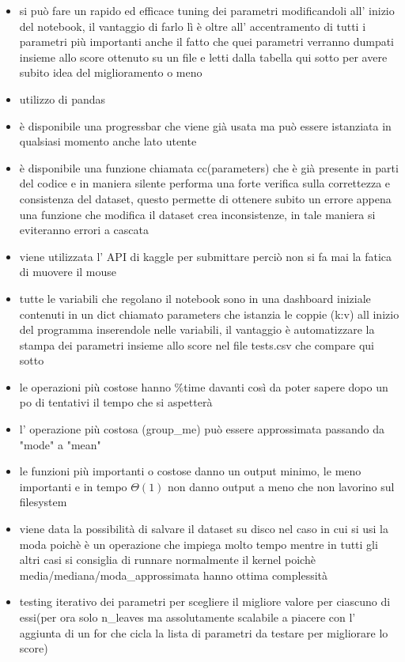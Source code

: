 \documentclass[11pt]{article}
\begin{document}
\begin{itemize}
\item
  si può fare un rapido ed efficace tuning dei parametri modificandoli
  all' inizio del notebook, il vantaggio di farlo lì è oltre all'
  accentramento di tutti i parametri più importanti anche il fatto che
  quei parametri verranno dumpati insieme allo score ottenuto su un file
  e letti dalla tabella qui sotto per avere subito idea del
  miglioramento o meno
\item
  utilizzo di pandas
\item
  è disponibile una progressbar che viene già usata ma può essere
  istanziata in qualsiasi momento anche lato utente
\item
  è disponibile una funzione chiamata cc(parameters) che è già presente
  in parti del codice e in maniera silente performa una forte verifica
  sulla correttezza e consistenza del dataset, questo permette di
  ottenere subito un errore appena una funzione che modifica il dataset
  crea inconsistenze, in tale maniera si eviteranno errori a cascata
\item
  viene utilizzata l' API di kaggle per submittare perciò non si fa mai
  la fatica di muovere il mouse
\item
  tutte le variabili che regolano il notebook sono in una dashboard
  iniziale contenuti in un dict chiamato parameters che istanzia le
  coppie (k:v) all inizio del programma inserendole nelle variabili, il
  vantaggio è automatizzare la stampa dei parametri insieme allo score
  nel file tests.csv che compare qui sotto
\item
  le operazioni più costose hanno \%time davanti così da poter sapere
  dopo un po di tentativi il tempo che si aspetterà
\item
  l' operazione più costosa (group\_me) può essere approssimata passando
  da "mode" a "mean"
\item
  le funzioni più importanti o costose danno un output minimo, le meno
  importanti e in tempo \(\Theta(1)\) non danno output a meno che non
  lavorino sul filesystem
\item
  viene data la possibilità di salvare il dataset su disco nel caso in
  cui si usi la moda poichè è un operazione che impiega molto tempo
  mentre in tutti gli altri casi si consiglia di runnare normalmente il
  kernel poichè media/mediana/moda\_approssimata hanno ottima
  complessità
\item
  testing iterativo dei parametri per scegliere il migliore valore per
  ciascuno di essi(per ora solo n\_leaves ma assolutamente scalabile a
  piacere con l' aggiunta di un for che cicla la lista di parametri da
  testare per migliorare lo score)
\end{itemize}
\end{document}
